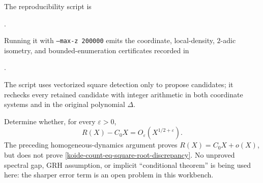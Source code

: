 The reproducibility script is
\begin{center}
 .
\end{center}
Running it with \texttt{--max-z 200000} emits the coordinate, local-density,
$2$-adic isometry, and bounded-enumeration certificates recorded in
\begin{center}
 .
\end{center}
The script uses vectorized square detection only to propose candidates; it
rechecks every retained candidate with integer arithmetic in both coordinate
systems and in the original polynomial $\Delta$.

\begin{test}
\label{koide-count-open-square-root-discrepancy}
\Open Determine whether, for every \(\varepsilon>0\),
\begin{equation}
 R(X)-C_0X=O_\varepsilon(X^{1/2+\varepsilon}).
 \label{koide-count-eq-square-root-discrepancy}
\end{equation}
The preceding homogeneous-dynamics argument proves
\(R(X)=C_0X+o(X)\), but does not prove
\eqref{koide-count-eq-square-root-discrepancy}.  No unproved spectral gap,
GRH assumption, or implicit ``conditional theorem'' is being used here:
the sharper error term is an open problem in this workbench.
\end{test}
